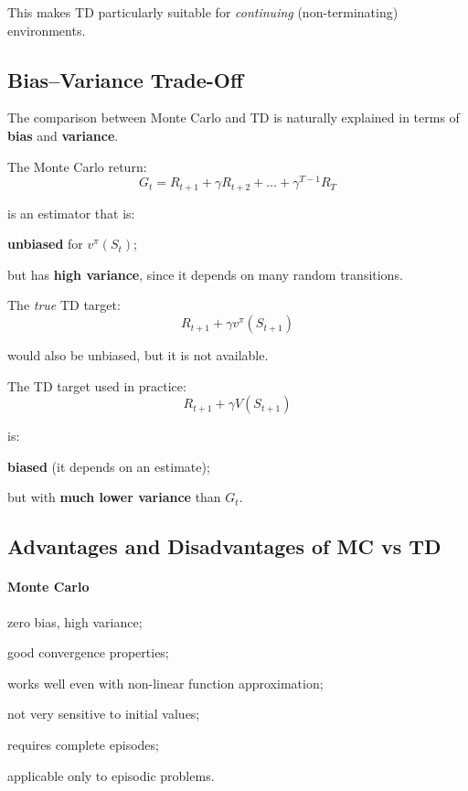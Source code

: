 This makes TD particularly suitable for \textit{continuing}
(non-terminating) environments.

\subsection{Bias--Variance Trade-Off}

The comparison between Monte Carlo and TD is naturally explained in terms
of \textbf{bias} and \textbf{variance}.

The Monte Carlo return:
\[
G_t = R_{t+1} + \gamma R_{t+2} + \dots + \gamma^{T-1} R_T
\]

is an estimator that is:
\begin{compactitemize}
    \item \textbf{unbiased} for $v^\pi(S_t)$;
    \item but has \textbf{high variance}, since it depends on many random transitions.
\end{compactitemize}

The \emph{true} TD target:
\[
R_{t+1} + \gamma v^\pi(S_{t+1})
\]

would also be unbiased, but it is not available.

The TD target used in practice:
\[
R_{t+1} + \gamma V(S_{t+1})
\]

is:
\begin{compactitemize}
    \item \textbf{biased} (it depends on an estimate);
    \item but with \textbf{much lower variance} than $G_t$.
\end{compactitemize}

\subsection{Advantages and Disadvantages of MC vs TD}

\paragraph{Monte Carlo}
\begin{compactitemize}
    \item zero bias, high variance;
    \item good convergence properties;
    \item works well even with non-linear function approximation;
    \item not very sensitive to initial values;
    \item requires complete episodes;
    \item applicable only to episodic problems.
\end{compactitemize}

